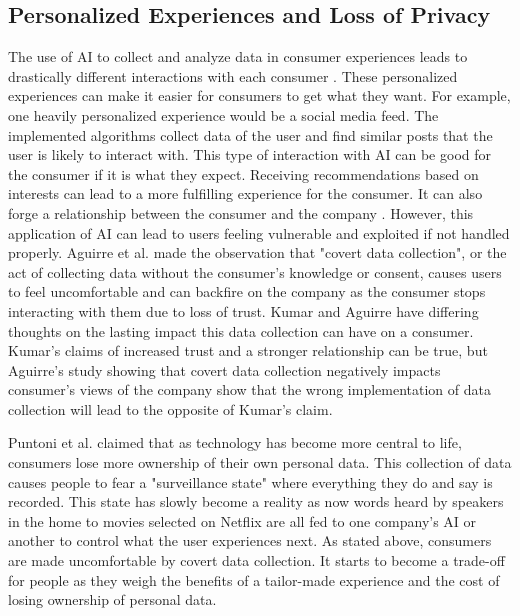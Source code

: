 \documentclass[12pt, man]{apa6}
\begin{document}
\subsection*{Personalized Experiences and Loss of Privacy}
The use of AI to collect and analyze data in consumer experiences leads to drastically different interactions with each consumer \parencite{Puntoni2021}.  These personalized experiences can make it easier for consumers to get what they want.  For example, one heavily personalized experience would be a social media feed.  The implemented algorithms collect data of the user and find similar posts that the user is likely to interact with.
This type of interaction with AI can be good for the consumer if it is what they expect.  Receiving recommendations based on interests can lead to a more fulfilling experience for the consumer.  It can also forge a relationship between the consumer and the company \parencite{Kumar2019}.  However, this application of AI can lead to users feeling vulnerable and exploited if not handled properly.  Aguirre et al. \parencite*{Aguirre2015} made the observation that "covert data collection", or the act of collecting data without the consumer's knowledge or consent, causes users to feel uncomfortable and can backfire on the company as the consumer stops interacting with them due to loss of trust.  Kumar and Aguirre have differing thoughts on the lasting impact this data collection can have on a consumer.  Kumar's claims of increased trust and a stronger relationship can be true, but Aguirre's study showing that covert data collection negatively impacts consumer's views of the company show that the wrong implementation of data collection will lead to the opposite of Kumar's claim.

Puntoni et al. \parencite*{Puntoni2021} claimed that as technology has become more central to life, consumers lose more ownership of their own personal data. This collection of data causes people to fear a "surveillance state" where everything they do and say is recorded.  This state has slowly become a reality as now words heard by speakers in the home to movies selected on Netflix are all fed to one company's AI or another to control what the user experiences next. As stated above, consumers are made uncomfortable by covert data collection.  It starts to become a trade-off for people as they weigh the benefits of a tailor-made experience and the cost of losing ownership of personal data.
\end{document}
